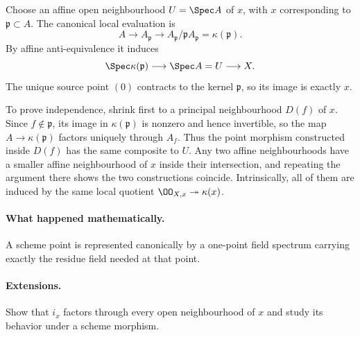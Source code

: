\begin{solution}
Choose an affine open neighbourhood $U=\Spec A$ of $x$, with $x$ corresponding to
$\mathfrak p\subset A$.  The canonical local evaluation is
\[
A\longrightarrow A_{\mathfrak p}\longrightarrow
A_{\mathfrak p}/\mathfrak pA_{\mathfrak p}=\kappa(\mathfrak p).
\]
By affine anti-equivalence it induces
\[
\Spec\kappa(\mathfrak p)\longrightarrow\Spec A=U\longrightarrow X.
\]
The unique source point $(0)$ contracts to the kernel $\mathfrak p$, so its image is exactly $x$.

To prove independence, shrink first to a principal neighbourhood $D(f)$ of $x$.  Since
$f\notin\mathfrak p$, its image in $\kappa(\mathfrak p)$ is nonzero and hence invertible, so the
map $A\to\kappa(\mathfrak p)$ factors uniquely through $A_f$.  Thus the point morphism constructed
inside $D(f)$ has the same composite to $U$.  Any two affine neighbourhoods have a smaller affine
neighbourhood of $x$ inside their intersection, and repeating the argument there shows the two
constructions coincide.  Intrinsically, all of them are induced by the same local quotient
$\OO_{X,x}\twoheadrightarrow\kappa(x)$.
\end{solution}

\paragraph{What happened mathematically.}
A scheme point is represented canonically by a one-point field spectrum carrying exactly the residue field needed at that point.

\paragraph{Extensions.}
Show that $i_x$ factors through every open neighbourhood of $x$ and study its behavior under a scheme morphism.
\fi
